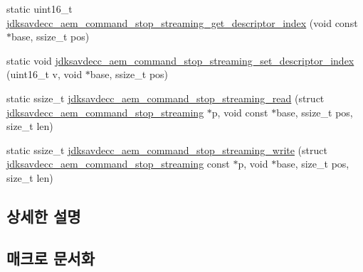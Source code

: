 \begin{DoxyCompactItemize}
\item 
static uint16\+\_\+t \hyperlink{group__command__stop__streaming_ga111e13ee078d14d77fc154886a2f0641}{jdksavdecc\+\_\+aem\+\_\+command\+\_\+stop\+\_\+streaming\+\_\+get\+\_\+descriptor\+\_\+index} (void const $\ast$base, ssize\+\_\+t pos)
\item 
static void \hyperlink{group__command__stop__streaming_ga8c844ca5d74be6cc5894a61295ec21d4}{jdksavdecc\+\_\+aem\+\_\+command\+\_\+stop\+\_\+streaming\+\_\+set\+\_\+descriptor\+\_\+index} (uint16\+\_\+t v, void $\ast$base, ssize\+\_\+t pos)
\item 
static ssize\+\_\+t \hyperlink{group__command__stop__streaming_gab97c51238aacb5269efcf694988ab1a3}{jdksavdecc\+\_\+aem\+\_\+command\+\_\+stop\+\_\+streaming\+\_\+read} (struct \hyperlink{structjdksavdecc__aem__command__stop__streaming}{jdksavdecc\+\_\+aem\+\_\+command\+\_\+stop\+\_\+streaming} $\ast$p, void const $\ast$base, ssize\+\_\+t pos, size\+\_\+t len)
\item 
static ssize\+\_\+t \hyperlink{group__command__stop__streaming_gab694a591019d29c8fa77482ac3a43f88}{jdksavdecc\+\_\+aem\+\_\+command\+\_\+stop\+\_\+streaming\+\_\+write} (struct \hyperlink{structjdksavdecc__aem__command__stop__streaming}{jdksavdecc\+\_\+aem\+\_\+command\+\_\+stop\+\_\+streaming} const $\ast$p, void $\ast$base, size\+\_\+t pos, size\+\_\+t len)
\end{DoxyCompactItemize}


\subsection{상세한 설명}


\subsection{매크로 문서화}
